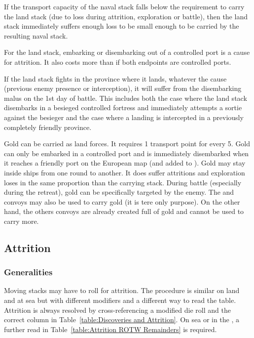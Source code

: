 If the transport capacity of the naval stack falls below the requirement to
carry the land stack (due to loss during attrition, exploration or battle),
then the land stack immediately suffers enough loss to be small enough to be
carried by the resulting naval stack.

For the land stack, embarking or disembarking out of a controlled port is a
cause for attrition. It also costs more \MP than if both endpoints are
controlled ports.

If the land stack fights in the province where it lands, whatever the cause
(previous enemy presence or interception), it will suffer from the
disembarking malus on the 1st day of battle. This includes both the case where
the land stack disembarks in a besieged controlled fortress and immediately
attempts a sortie against the besieger and the case where a landing is
intercepted in a previously completely friendly province.

Gold can be carried as land forces. It requires 1 transport point for every
5\ducats. Gold can only be embarked in a controlled port and is immediately
disembarked when it reaches a friendly port on the European map (and added to
). Gold may stay inside ships from
one round to another. It does suffer attritions and exploration loses in the
same proportion than the carrying stack. During battle (especially during the
retreat), gold can be specifically targeted by the enemy. The  and  convoys may also be used to carry gold (it
is tere only purpose). On the other hand, the others convoys are already
created full of gold and cannot be used to carry more.



\subsection{Attrition}
\subsubsection{Generalities}
Moving stacks may have to roll for attrition. The procedure is similar on land
and at sea but with different modifiers and a different way to read the
table. Attrition is always resolved by cross-referencing a modified die roll
and the correct column in Table~\ref{table:Discoveries and Attrition}. On sea
or in the \ROTW, a further read in Table~\ref{table:Attrition ROTW Remainders}
is required.

